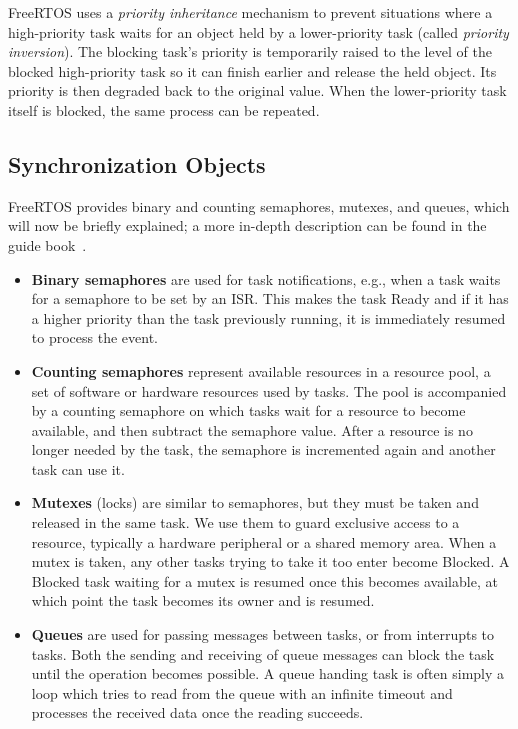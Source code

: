 FreeRTOS uses a \textit{priority inheritance} mechanism to prevent situations where a high-priority task waits for an object held by a lower-priority task (called \textit{priority inversion}). The blocking task's priority is temporarily raised to the level of the blocked high-priority task so it can finish earlier and release the held object. Its priority is then degraded back to the original value. When the lower-priority task itself is blocked, the same process can be repeated.

\subsection{Synchronization Objects}

FreeRTOS provides binary and counting semaphores, mutexes, and queues, which will now be briefly explained; a more in-depth description can be found in the guide book~\cite{freertos-book}.

\begin{itemize}
	\item \textbf{Binary semaphores} are used for task notifications, e.g., when a task waits for a semaphore to be set by an \gls{ISR}. This makes the task Ready and if it has a higher priority than the task previously running, it is immediately resumed to process the event.

	\item  \textbf{Counting semaphores} represent available resources in a resource pool, a set of software or hardware resources used by tasks. The pool is accompanied by a counting semaphore on which tasks wait for a resource to become available, and then subtract the semaphore value. After a resource is no longer needed by the task, the semaphore is incremented again and another task can use it.

	\item \textbf{Mutexes} (locks) are similar to semaphores, but they must be taken and released in the same task. We use them to
	guard exclusive access to a resource, typically a hardware peripheral or a shared memory area. When a mutex is taken, any other tasks trying to take it too enter become Blocked. A Blocked task waiting for a mutex is resumed once this becomes available, at which point the task becomes its owner and is resumed.

	\item \textbf{Queues} are used for passing messages between tasks, or from interrupts to tasks. Both the sending and receiving of queue messages can block the task until the operation becomes possible. A queue handing task is often simply a loop which tries to read from the queue with an infinite timeout and processes the received data once the reading succeeds.
\end{itemize}

